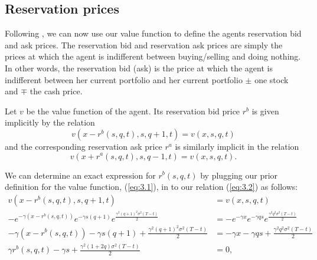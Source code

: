 \subsection*{Reservation prices}

Following \cite{AS2008}, we can now use our value function to define the agents 
reservation bid and ask prices.
The reservation bid and reservation ask prices are simply the prices at which the agent
is indifferent between buying/selling and doing nothing. In other words, the reservation
bid (ask) is the price at which the agent is indifferent between her current portfolio
and her current portfolio $\pm$ one stock and $\mp$ the cash price.

\begin{definition}\label{def:3.3.1}
    Let $v$ be the value function of the agent. Its reservation bid price $r^b$ is
    given implicitly by the relation
    \begin{equation}\label{eq:3.2}
        v(x-r^b(s,q,t),s,q+1,t)=v(x,s,q,t)
    \end{equation}
    and the corresponding reservation ask price $r^a$ is similarly implicit in the 
    relation
    \begin{equation}\label{eq:3.3}
        v(x+r^a(s,q,t),s,q-1,t)=v(x,s,q,t).
    \end{equation}
\end{definition}

We can determine an exact expression for $r^b(s,q,t)$ by plugging our prior definition
for the value function, (\ref{eq:3.1}), in to our relation (\ref{eq:3.2}) as follows:
\begin{align*}
    v(x-r^b(s,q,t),s,q+1,t)&=v(x,s,q,t)\\
    -e^{-\gamma(x-r^b(s,q,t))}e^{-\gamma s(q+1)}e^{\frac{\gamma^2(q+1)^2\sigma^2(T-t)}{2}}&=-e^{-\gamma x}e^{-\gamma q s}e^{\frac{\gamma^2q^2\sigma^2(T-t)}{2}}\\
    -\gamma(x-r^b(s,q,t))-\gamma s(q+1) + \frac{\gamma^2(q+1)^2\sigma^2(T-t)}{2} &= -\gamma x-\gamma q s + \frac{\gamma^2q^2\sigma^2(T-t)}{2}\\
    \gamma r^b(s,q,t)-\gamma s + \frac{\gamma^2(1+2q)\sigma^2(T-t)}{2} &=0,
\end{align*}

